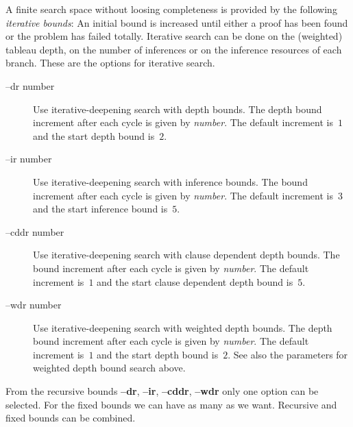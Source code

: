 A finite search space without loosing completeness is provided by the
following {\it iterative bounds\/}: 
An initial bound is increased until either a proof has been found or
the problem has failed totally. 
Iterative search can be done on the (weighted) tableau depth, on the
number of inferences or on the inference resources of each branch. 
These are the options for iterative search.
\begin{description}
      \item[--dr \lb number\rb]
           {Use iterative-deepening search with depth  bounds.  The
            depth bound  increment  after  each  cycle  is given by
            {\it number\/}. The default increment is~$1$ and the start
            depth bound is~$2$.}
      \item[--ir \lb number\rb]
           {Use iterative-deepening search with  inference  bounds.
            The  bound  increment  after  each  cycle  is  given by
            {\it number\/}. The default increment is~$3$ and the start
            inference bound is~$5$.}
      \item[--cddr \lb number\rb]
           {Use iterative-deepening search with clause dependent
            depth bounds. The bound increment after each cycle is given 
            by {\it number\/}. The default increment is~$1$ and the start
            clause dependent depth bound is~$5$.}
      \item[--wdr \lb number\rb]
           Use  iterative-deepening  search  with  weighted  depth
           bounds.  The depth bound  increment after each cycle is
           given by {\it number\/}. The default increment is~$1$  and  the
           start  depth  bound  is~$2$. See also the parameters for
           weighted depth bound search above.
\end{description}

\begin{remark}
From the recursive bounds {\bf --dr}, {\bf --ir},  {\bf --cddr}, {\bf --wdr}  
only  one option  can  be  selected.  For the fixed bounds we can
have as many as we want. Recursive and fixed bounds can be combined.
\end{remark}

